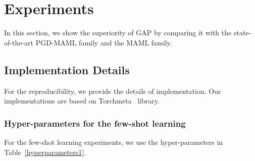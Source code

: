 \section{Experiments}
In this section, we show the superiority of GAP by comparing it with the state-of-the-art PGD-MAML family and the MAML family. 

\subsection{Implementation Details}
For the reproducibility, we provide the details of implementation. Our implementations are based on Torchmeta~\cite{deleu2019torchmeta} library. 

\subsubsection{Hyper-parameters for the few-shot learning}
\label{sec:5.1.1}
For the few-shot learning experiments, we use the hyper-parameters in Table~\ref{hyperparameters1}.
